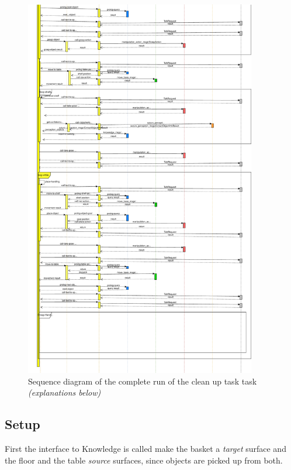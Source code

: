 \documentclass[main.tex]{subfiles}
\begin{document}
	  	\begin{figure}[H]
	  		\centering
	  		\includegraphics[width=0.9\textwidth]{pictures/diagramms/grocery_02_seq}
	  		\caption{Sequence diagram of the complete run of the clean up task task \textit{(explanations below)}}
	  		\label{clean_up_seq_02}
	  	\end{figure}
	  	
	\subsection{Setup}
	\begin{knowledge}	
	First the interface to Knowledge is called make the basket a \textit{target} surface and the floor and the table \textit{source} surfaces, since objects are picked up from both.
	\end{knowledge}
	
\end{document}
